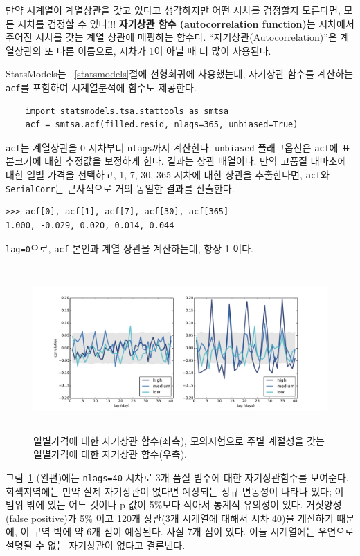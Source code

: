 만약 시계열이 계열상관을 갖고 있다고 생각하지만 어떤 시차를 검정할지 모른다면, 모든 시차를 검정할 수 있다!!! {\bf 자기상관 함수 (autocorrelation function)}는 시차에서 주어진 시차를 갖는 계열 상관에 매핑하는 함수다. ``자기상관(Autocorrelation)''은 계열상관의 또 다른 이름으로, 시차가 1이 아닐 때 더 많이 사용된다.

StatsModels는 ~\ref{statsmodels}절에 선형회귀에 사용했는데, 자기상관 함수를 계산하는 {\tt acf}를 포함하여 시계열분석에 함수도 제공한다.

\begin{verbatim}
    import statsmodels.tsa.stattools as smtsa
    acf = smtsa.acf(filled.resid, nlags=365, unbiased=True)
\end{verbatim}

{\tt acf}는 계열상관을 0 시차부터 {\tt nlags}까지 계산한다.
{\tt unbiased} 플래그옵션은 {\tt acf}에 표본크기에 대한 추정값을 보정하게 한다. 결과는 상관 배열이다. 만약 고품질 대마초에 대한 일별 가격을 선택하고, 1, 7, 30, 365 시차에 대한 상관을 추출한다면, 
{\tt acf}와 {\tt SerialCorr}는 근사적으로 거의 동일한 결과를 산출한다.

\begin{verbatim}
>>> acf[0], acf[1], acf[7], acf[30], acf[365]
1.000, -0.029, 0.020, 0.014, 0.044
\end{verbatim}

{\tt lag=0}으로, {\tt acf} 본인과 계열 상관을 계산하는데, 항상 1 이다.

\begin{figure}
\centerline{\includegraphics[height=2.5in]{figs/timeseries9.pdf}}
\caption{일별가격에 대한 자기상관 함수(좌측), 모의시험으로 주별 계절성을 갖는 일별가격에 대한 자기상관 함수(우측).}
\label{timeseries9}
\end{figure}

그림~\ref{timeseries9} (왼편)에는 {\tt nlags=40} 시차로 3개 품질 범주에 대한 자기상관함수를 보여준다.
회색지역에는 만약 실제 자기상관이 없다면 예상되는 정규 변동성이 나타나 있다; 이 범위 밖에 있는 어느 것이나 p-값이 5\%보다 작아서 통계적 유의성이 있다. 거짓양성(false positive)가 5\% 이고 120개 상관(3개 시계열에 대해서 시차 40)을 계산하기 때문에, 이 구역 박에 약 6개 점이 예상된다.
사실 7개 점이 있다. 이들 시계열에는 우연으로 설명될 수 없는 자기상관이 없다고 결론낸다.

